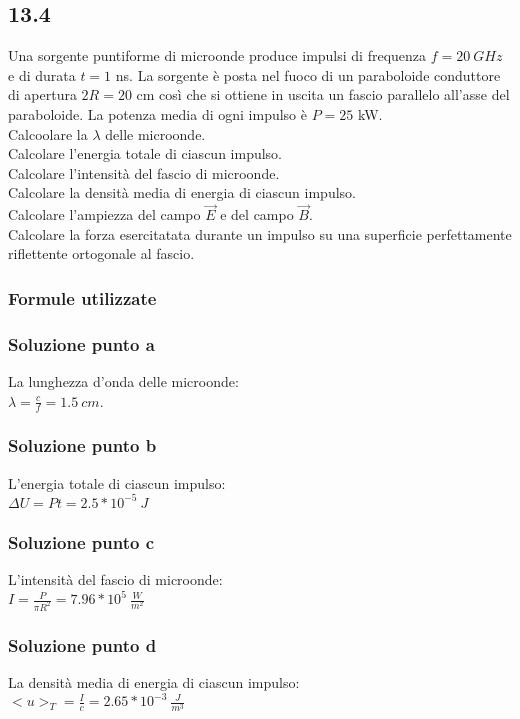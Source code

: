 \documentclass[../../main.tex]{subfiles}
\begin{document}
\subsection*{13.4}
Una sorgente puntiforme di microonde produce impulsi di frequenza $f = 20\ GHz$ e di durata $t = 1$ ns. La sorgente è posta nel fuoco di un paraboloide conduttore di apertura $2R = 20$ cm così che si ottiene in uscita un fascio parallelo all'asse del paraboloide. La potenza media di ogni impulso è $P = 25$ kW.\\
Calcoolare la $\lambda$ delle microonde.\\
Calcolare l'energia totale di ciascun impulso.\\
Calcolare l'intensità del fascio di microonde.\\
Calcolare la densità media di energia di ciascun impulso.\\
Calcolare l'ampiezza del campo $\vec{E}$ e del campo $\vec{B}$.\\
Calcolare la forza esercitatata durante un impulso su una superficie perfettamente riflettente ortogonale al fascio.\\
\subsubsection*{Formule utilizzate}
\subsubsection*{Soluzione punto a}
La lunghezza d'onda delle microonde:\\
$\lambda = \frac{c}{f} = 1.5\ cm$.
\subsubsection*{Soluzione punto b}
L'energia totale di ciascun impulso:\\
$\Delta U = P t = 2.5 * 10^{-5}\ J$
\subsubsection*{Soluzione punto c}
L'intensità del fascio di microonde:\\
$I = \frac{P}{\pi R^2} = 7.96 * 10^5\ \frac{W}{m^2}$
\subsubsection*{Soluzione punto d}
La densità media di energia di ciascun impulso:\\
$<u>_T = \frac{I}{c} = 2.65 * 10^{-3}\ \frac{J}{m^3}$
\end{document}

